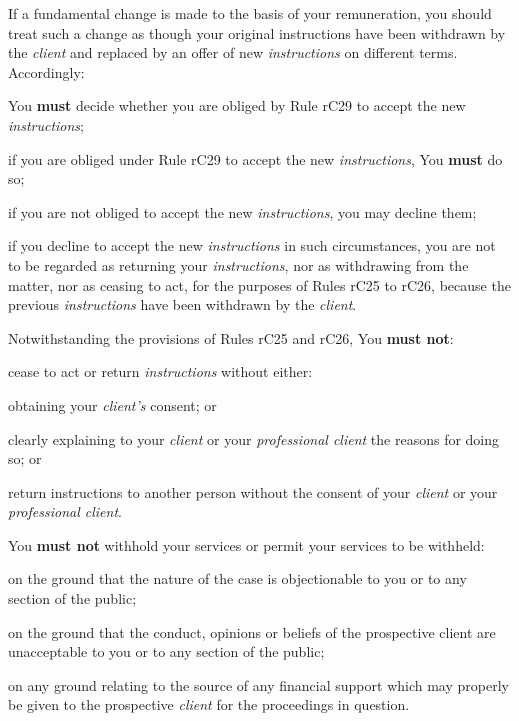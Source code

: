 If a fundamental change is made to the basis of your remuneration, you
should treat such a change as though your original instructions have
been withdrawn by the \emph{client} and replaced by an offer of new
\emph{instructions} on different terms. Accordingly:
\begin{numlist}\item You \textcolor{myred}{\textbf{must}} decide whether you are obliged by Rule rC29 to accept the
new \emph{instructions};
\item if you are obliged under Rule rC29 to accept the new
\emph{instructions}, You \textcolor{myred}{\textbf{must}} do so;
\item if you are not obliged to accept the new \emph{instructions}, you may
decline them;
\item if you decline to accept the new \emph{instructions} in such
circumstances, you are not to be regarded as returning your
\emph{instructions}, nor as withdrawing from the matter, nor as ceasing
to act, for the purposes of Rules rC25 to rC26, because the previous
\emph{instructions} have been withdrawn by the \emph{client}.
\end{numlist}




Notwithstanding the provisions of Rules rC25 and rC26, You \textcolor{myred}{\textbf{must not}}:
\begin{numlist}\item cease to act or return \emph{instructions} without either:
\begin{alphlist}\item obtaining your \emph{client's} consent; or
\item clearly explaining to your \emph{client} or your \emph{professional
client} the reasons for doing so; or\end{alphlist}
\item return instructions to another person without the consent of your
\emph{client} or your \emph{professional client}.
\end{numlist}




You \textcolor{myred}{\textbf{must not}} withhold your services or permit your services to be
withheld:
\begin{numlist}\item on the ground that the nature of the case is objectionable to you or
to any section of the public;
\item on the ground that the conduct, opinions or beliefs of the
prospective client are unacceptable to you or to any section of the
public;
\item on any ground relating to the source of any financial support which
may properly be given to the prospective \emph{client} for the
proceedings in question.
\end{numlist}


